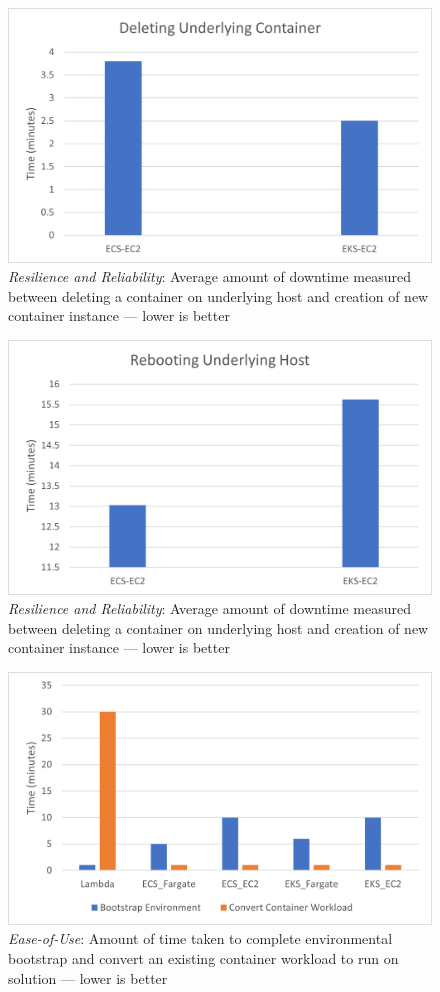 \begin{figure}[hp]
  \includegraphics{images/rr-deleteContainer.png}
  \caption{\emph{Resilience and Reliability}: Average amount of downtime measured between deleting a container on underlying host and creation of new container instance --- lower is better}
  \label{fig:rr_deleteContainer}
\end{figure}

\begin{figure}[hp]
  \includegraphics{images/rr-reboot.png}
  \caption{\emph{Resilience and Reliability}: Average amount of downtime measured between deleting a container on underlying host and creation of new container instance --- lower is better}
  \label{fig:rr_reboot}
\end{figure}

\begin{figure}[hp]
  \includegraphics{images/eou.png}
  \caption{\emph{Ease-of-Use}: Amount of time taken to complete environmental bootstrap and convert an existing container workload to run on solution --- lower is better}
  \label{fig:eou}
\end{figure}
